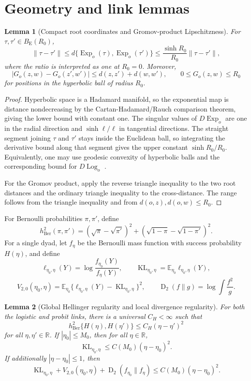\documentclass[
  12pt]{article}
\newtheorem{lemma}{Lemma}[section]
\theoremstyle{definition}
\theoremstyle{plain}
\newcommand{\R}{\mathbb R}
\newcommand{\E}{\mathbb E}
\newcommand{\KL}{\operatorname{KL}}
\newcommand{\Renyi}{\operatorname{D}_{2}}
\newcommand{\hBer}{h_{\mathrm{Ber}}}
\DeclareMathOperator{\Exp}{Exp}
\DeclareMathOperator{\Log}{Log}
\begin{document}
\section{Geometry and link lemmas}

\begin{lemma}[Compact root coordinates and Gromov-product Lipschitzness]
	\label{supp:geometrylip}
	For $\tau,\tau'\in B_{\mathrm E}(R_0)$,
	\[
	\|\tau-\tau'\|
	\le d\{\Exp_o(\tau),\Exp_o(\tau')\}
	\le \frac{\sinh R_0}{R_0}\|\tau-\tau'\|,
	\]
	where the ratio is interpreted as one at $R_0=0$. Moreover,
	\[
	|G_o(z,w)-G_o(z',w')|
	\le d(z,z')+d(w,w'),
	\qquad 0\le G_o(z,w)\le R_0
	\]
	for positions in the hyperbolic ball of radius $R_0$.
\end{lemma}

\begin{proof}
	Hyperbolic space is a Hadamard manifold, so the exponential map is distance nondecreasing by the Cartan-Hadamard/Rauch comparison theorem, giving the lower bound with constant one. The singular values of $D\Exp_o$ are one in the radial direction and $\sinh \ell/\ell$ in tangential directions. The straight segment joining $\tau$ and $\tau'$ stays inside the Euclidean ball, so integrating the derivative bound along that segment gives the upper constant $\sinh R_0/R_0$. Equivalently, one may use geodesic convexity of hyperbolic balls and the corresponding bound for $D\Log_o$ \citep{bridson_1999_MetricSpacesNonpositive}.
	
	For the Gromov product, apply the reverse triangle inequality to the two root distances and the ordinary triangle inequality to the cross-distance. The range follows from the triangle inequality and from $d(o,z),d(o,w)\le R_0$.
\end{proof}

For Bernoulli probabilities $\pi,\pi'$, define
\[
\hBer^2(\pi,\pi')=(\sqrt\pi-\sqrt{\pi'})^2+
(\sqrt{1-\pi}-\sqrt{1-\pi'})^2.
\]
For a single dyad, let $f_\eta$ be the Bernoulli mass function with success probability $H(\eta)$, and define
\[
\ell_{\eta_0,\eta}(Y)=\log\frac{f_{\eta_0}(Y)}{f_\eta(Y)},
\qquad
\KL_{\eta_0,\eta}=\E_{\eta_0}\ell_{\eta_0,\eta}(Y),
\]
\[
V_{2,0}(\eta_0,\eta)=
\E_{\eta_0}\{\ell_{\eta_0,\eta}(Y)-\KL_{\eta_0,\eta}\}^2,
\qquad
\Renyi(f\|g)=\log\int \frac{f^2}{g}.
\]

\begin{lemma}[Global Hellinger regularity and local divergence regularity]
	\label{supp:link}
	For both the logistic and probit links, there is a universal $C_H<\infty$ such that
	\[
	\hBer^2\{H(\eta),H(\eta')\}\le C_H(\eta-\eta')^2
	\]
	for all $\eta,\eta'\in\R$. If $|\eta_0|\le M_0$, then for all $\eta\in\R$,
	\[
	\KL_{\eta_0,\eta}\le C(M_0)(\eta-\eta_0)^2.
	\]
	If additionally $|\eta-\eta_0|\le1$, then
	\[
	\KL_{\eta_0,\eta}+V_{2,0}(\eta_0,\eta)+\Renyi(f_{\eta_0}\|f_\eta)
	\le C(M_0)(\eta-\eta_0)^2.
	\]
\end{lemma}
\end{document}
